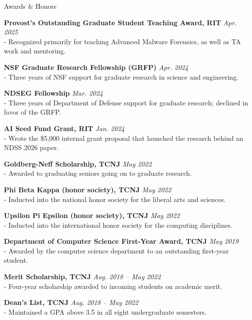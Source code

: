 \documentclass{cv} %
\newif\ifawarddescs \awarddescstrue %
\newcommand{\awarddesc}[1]{\ifawarddescs\\- #1\fi}
\newcommand{\tightentries}{\vspace*{\parskip}\setlength{\parskip}{0pt}} %
\begin{document}
\begin{rSection}{Awards \& Honors}
\ifawarddescs\else\tightentries\fi
{\bf Provost's Outstanding Graduate Student Teaching Award, RIT} \hfill {\em Apr. 2025} %
\awarddesc{Recognized primarily for teaching Advanced Malware Forensics, as well as TA work and mentoring.}

{\bf NSF Graduate Research Fellowship (GRFP)} \hfill {\em Apr. 2024} %
\awarddesc{Three years of NSF support for graduate research in science and engineering.}

{\bf NDSEG Fellowship} \hfill {\em Mar. 2024} %
\awarddesc{Three years of Department of Defense support for graduate research; declined in favor of the GRFP.}

{\bf AI Seed Fund Grant, RIT} \hfill {\em Jan. 2024} %
\awarddesc{Wrote the \$5,000 internal grant proposal that launched the research behind an NDSS 2026 paper.}

{\bf Goldberg-Neff Scholarship, TCNJ} \hfill {\em May 2022} %
\awarddesc{Awarded to graduating seniors going on to graduate research.}

{\bf Phi Beta Kappa (honor society), TCNJ} \hfill {\em May 2022}
\awarddesc{Inducted into the national honor society for the liberal arts and sciences.}

{\bf Upsilon Pi Epsilon (honor society), TCNJ} \hfill {\em May 2022}
\awarddesc{Inducted into the international honor society for the computing disciplines.}

{\bf Department of Computer Science First-Year Award, TCNJ} \hfill {\em May 2019}
\awarddesc{Awarded by the computer science department to an outstanding first-year student.}

{\bf Merit Scholarship, TCNJ} \hfill {\em Aug. 2018 -- May 2022} %
\awarddesc{Four-year scholarship awarded to incoming students on academic merit.}

{\bf Dean's List, TCNJ} \hfill {\em Aug. 2018 -- May 2022}
\awarddesc{Maintained a GPA above 3.5 in all eight undergraduate semesters.}
\end{rSection}
\end{document}
